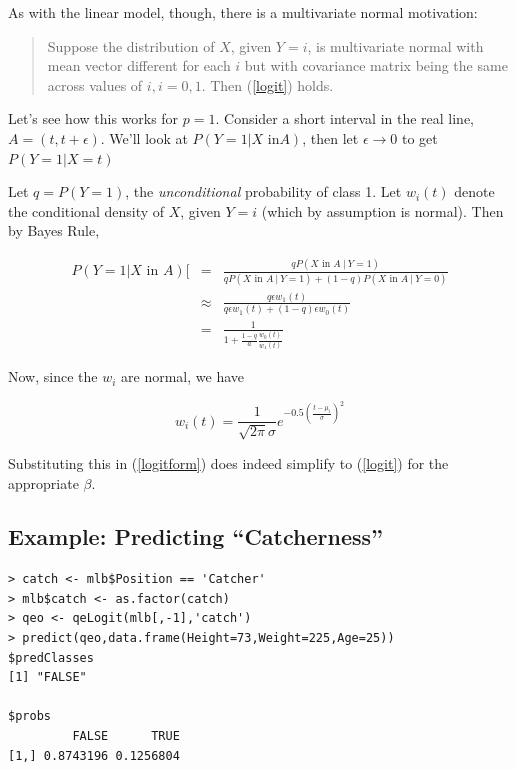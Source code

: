 As with the linear model, though, there is a multivariate normal
motivation:

\begin{quote}
Suppose the distribution of $X$, given $Y = i$, is multivariate normal
with mean vector different for each $i$ but with covariance matrix being
the same across values of $i, i = 0,1$.  Then (\ref{logit}) holds.
\end{quote}

Let's see how this works for $p = 1$.  Consider a short interval in the
real line, $A = (t,t+\epsilon)$.  We'll look at $P(Y = 1 | X \textrm{ in
} A)$, then let $\epsilon \rightarrow 0$ to get $P(Y = 1 | X = t)$

Let $q = P(Y = 1)$, the \textit{unconditional} probability of class 1.
Let $w_i(t)$ denote the conditional density of $X$, given $Y = i$ (which
by assumption is normal).  Then by Bayes Rule,

\begin{eqnarray}
P(Y = 1 | X \textrm{ in } A) [&=& 
\frac
{q P(X \textrm{ in } A ~|~  Y = 1)}
{
{q P(X \textrm{ in } A ~|~ Y = 1)} +
(1-q) P(X \textrm{ in } A ~|~ Y = 0) 
} \\
&\approx&  
\frac{q \epsilon w_1(t)}
{q \epsilon w_1(t) + (1-q) \epsilon w_0(t)} \\
&=& 
\label{logitform}
\frac{1}{1 + \frac{1-q}{a} \frac{w_0(t)}{w_1(t)}}
\end{eqnarray}

Now, since the $w_i$ are normal, we have

\begin{equation}
w_i(t) = 
\frac{1}{\sqrt{2 \pi} \sigma}
e^{-0.5 \left ( \frac{t-\mu_i}{\sigma} \right )^2}
\end{equation}

Substituting this in (\ref{logitform}) does indeed simplify to
(\ref{logit}) for the appropriate $\beta$.

\subsection{Example:  Predicting ``Catcherness''}

\begin{lstlisting}
> catch <- mlb$Position == 'Catcher'
> mlb$catch <- as.factor(catch)
> qeo <- qeLogit(mlb[,-1],'catch')
> predict(qeo,data.frame(Height=73,Weight=225,Age=25))
$predClasses
[1] "FALSE"

$probs
         FALSE      TRUE
[1,] 0.8743196 0.1256804
\end{lstlisting}

